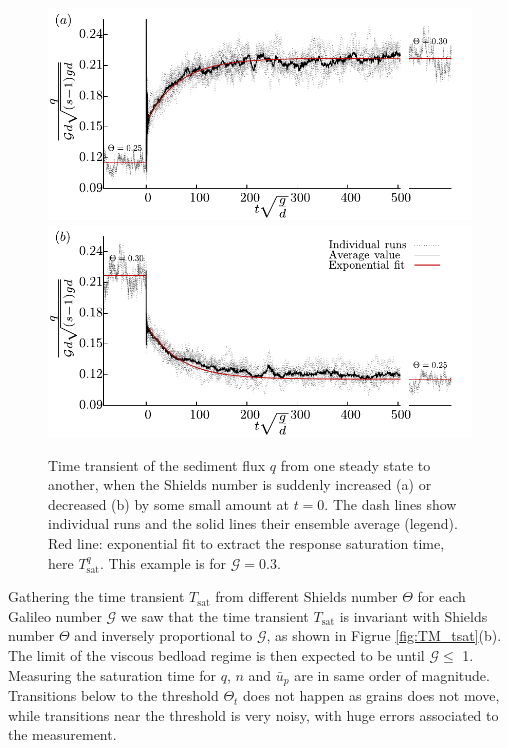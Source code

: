 \begin{figure}[H]
    \centering
    \includegraphics[width=0.8\linewidth]{04-figuras/TMa-transitionqup.pdf}
    \includegraphics[width=0.8\linewidth]{04-figuras/TMb-transitionqdown.pdf}
    \caption[Temporal transport transition.]{Time transient of the sediment flux $q$ from one steady state to another, when the Shields number is suddenly increased (a) or decreased (b) by some small amount at $t=0$. The dash lines show individual runs and the solid lines their ensemble average (legend). Red line: exponential fit to extract the response saturation time, here $T^q_\textrm{sat}$. This example is for $\mathcal{G}=0.3$.}
    \label{fig:TM_transition}
\end{figure}

    Gathering the time transient $T_\textrm{sat}$ from different Shields number $\Theta$ for each Galileo number $\mathcal{G}$ we saw that the time transient $T_\textrm{sat}$ is invariant with Shields number $\Theta$ and inversely proportional to $\mathcal{G}$, as shown in Figrue \ref{fig:TM_tsat}(b). The limit of the viscous bedload regime is then expected to be until $\mathcal{G} \leq$ 1. Measuring the saturation time for $q$, $n$ and $\bar{u}_{p}$ are in same order of magnitude. Transitions below to the threshold $\Theta_t$ does not happen as grains does not move, while transitions near the threshold is very noisy, with huge errors associated to the measurement.

